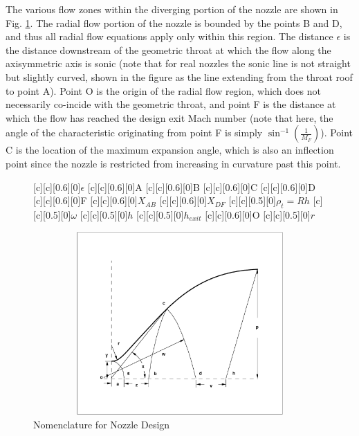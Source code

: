 	The various flow zones within the diverging portion of the nozzle are shown in 
Fig. \ref{fig:nozzle}.  The radial
flow portion of the nozzle is bounded by the points B and D, and thus all radial flow 
equations apply only within this region.  The distance $\epsilon$ is the distance downstream of the
geometric throat at which the flow along the axisymmetric axis is sonic (note that for real nozzles
the sonic line is not straight but slightly curved, shown in the figure as the line extending
from the throat roof to point A).  Point O is the origin of the radial flow region, which does
not necessarily co-incide with the geometric throat, and point F is the distance at which the
flow has reached the design exit Mach number (note that here, the angle of the characteristic
originating from point F is simply $\sin^{-1}(\frac{1}{M_F})$).  Point C is the location of the maximum 
expansion angle, which is also an inflection point since the nozzle is restricted from increasing in 
curvature past this point.

\begin{figure}[hb]
\begin{center}
[c][c][0.6][0]{$\epsilon$}
[c][c][0.6][0]{A}
[c][c][0.6][0]{B}
[c][c][0.6][0]{C}
[c][c][0.6][0]{D}
[c][c][0.6][0]{F}
[c][c][0.6][0]{$X_{AB}$}
[c][c][0.6][0]{$X_{DF}$}
[c][c][0.5][0]{$\rho_t = Rh$}
[c][c][0.5][0]{$\omega$}
[c][c][0.5][0]{$h$}
[c][c][0.5][0]{$h_{exit}$}
[c][c][0.6][0]{O}
[c][c][0.5][0]{$r$}

\includegraphics[width=13cm,height=7cm]{nozzle.eps}
\caption{Nomenclature for Nozzle Design}
\label{fig:nozzle}
\end{center}
\end{figure}

